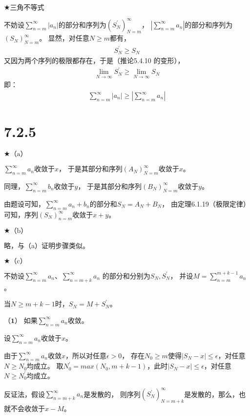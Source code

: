 \documentclass{article}
\theoremstyle{mystyle}
\begin{document}
$\bigstar \text{三角不等式}$

不妨设$\sum \limits_{n=m} ^{\infty} |a_n|$的部分和序列为$(S_N^\prime)_{N=m}^{\infty}$，
$|\sum \limits_{n=m} ^{\infty} a_n|$的部分和序列为$(S_N)_{N=m}^{\infty}$。
显然，对任意$N \geq m$都有，
\begin{align*}
  S_N^\prime \geq S_N
\end{align*}
又因为两个序列的极限都存在，于是（推论5.4.10 的变形），
\begin{align*}
  \lim \limits_{N \rightarrow \infty} S_N^\prime
  \geq \lim \limits_{N \rightarrow \infty} S_N
\end{align*}
即：
\begin{align*}
  \sum \limits_{n=m} ^{\infty} |a_n| \geq |\sum \limits_{n=m} ^{\infty} a_n|
\end{align*}

\section*{7.2.5}

$\bigstar \text{（a）}$

$\sum \limits_{n=m} ^{\infty} a_n$收敛于$x$，
于是其部分和序列$(A_N)_{N=m}^{\infty}$收敛于$x$。

同理，$\sum \limits_{n=m} ^{\infty} b_n$收敛于$y$，
于是其部分和序列$(B_N)_{N=m}^{\infty}$收敛于$y$。

由题设可知，$\sum \limits_{n=m} ^{\infty} a_n + b_n$的部分和$S_N = A_N + B_N$，
由定理6.1.19（极限定律）可知，序列$(S_N)_{n=m}^\infty$收敛于$x + y$。

$\bigstar \text{（b）}$

略，与（a）证明步骤类似。

$\bigstar \text{（c）}$

不妨设$\sum \limits_{n=m} ^{\infty} a_n$、$\sum \limits_{n=m+k} ^{\infty} a_n$
的部分和分别为$S_N, S_N^\prime$，
并设$M = \sum \limits_{n=m} ^{m+k-1} a_n$。

当$N \geq m+k-1$时，$S_N = M + S_N^\prime$。

$\textbf{（1）}$ 如果$\sum \limits_{n=m} ^{\infty} a_n$收敛。

设$\sum \limits_{n=m} ^{\infty} a_n$收敛于$x$。


由于$\sum \limits_{n=m} ^{\infty} a_n$收敛$x$，所以对任意$\epsilon > 0$，
存在$N_0 \geq m$使得$|S_N - x| \leq \epsilon$，对任意$N \geq N_0$均成立。
取$N_0^\prime = max(N_0, m+k-1)$，此时$|S_N - x| \leq \epsilon$，对任意$N \geq N_0^\prime$均成立。

反证法，假设$\sum \limits_{n=m+k} ^{\infty} a_n$是发散的，
则序列$(S_N^\prime)_{N=m+k}^\infty$是发散的，那么，也就不会收敛于$x-M$。
\end{document}
